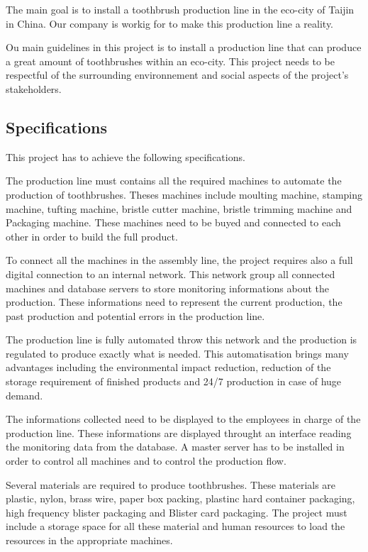 The main goal is to install a toothbrush production line in the eco-city of Taijin in China.
Our company is workig for \moldco to make this production line a reality.

Ou main guidelines in this project is to install a production line that can produce a great amount of toothbrushes within an eco-city.
This project needs to be respectful of the surrounding environnement and social aspects of the project's stakeholders.

\subsection{Specifications}

This project has to achieve the following specifications.

The production line must contains all the required machines to automate the production of toothbrushes.
Theses machines include moulting machine, stamping machine, tufting machine, bristle cutter machine, bristle trimming machine and Packaging machine.
These machines need to be buyed and connected to each other in order to build the full product.

To connect all the machines in the assembly line, the project requires also a full digital connection to an internal network.
This network group all connected machines and database servers to store monitoring informations about the production.
These informations need to represent the current production, the past production and potential errors in the production line.

The production line is fully automated throw this network and the production is regulated to produce exactly what is needed.
This automatisation brings many advantages including the environmental impact reduction, reduction of the storage requirement of finished products and 24/7 production in case of huge demand.

The informations collected need to be displayed to the employees in charge of the production line.
These informations are displayed throught an interface reading the monitoring data from the database.
A master server has to be installed in order to control all machines and to control the production flow.

Several materials are required to produce toothbrushes.
These materials are plastic, nylon, brass wire, paper box packing, plastinc hard container packaging, high frequency blister packaging and Blister card packaging.
The project must include a storage space for all these material and human resources to load the resources in the appropriate machines.

